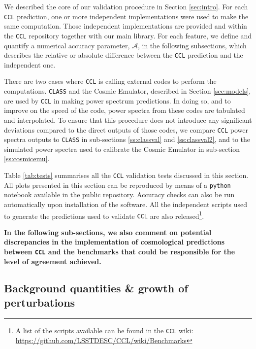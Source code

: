 \documentclass[\docopts]{\docclass}
\newcommand{\ccl}{{\tt CCL}\xspace}
\begin{document}
We described the core of our validation procedure in Section \ref{sec:intro}. For each \ccl prediction, one or more independent implementations were used to make the same computation. Those independent implementations are provided and within the \ccl repository together with our main library. For each feature, we define and quantify a numerical accuracy parameter, $\mathcal{A}$, in the following subsections, which describes the relative or absolute difference between the \ccl prediction and the independent one. 

There are two cases where \ccl is calling external codes to perform the computations. {\tt CLASS} and the Cosmic Emulator, described in Section \ref{sec:models}, are used by \ccl in making power spectrum predictions. In doing so, and to improve on the speed of the code, power spectra from these codes are tabulated and interpolated. To ensure that this procedure does not introduce any significant deviations compared to the direct outputs of those codes, we compare \ccl power spectra outputs to {\tt CLASS} in sub-sections \ref{ss:classval} and  \ref{ss:classval2}, and to the simulated power spectra used to calibrate the Cosmic Emulator in sub-section \ref{ss:cosmicemu}.



Table \ref{tab:tests} summarises all the \ccl validation tests discussed in this section. All plots presented in this section can be reproduced by means of a {\tt python} notebook available in the public repository. Accuracy checks can also be run automatically upon installation of the software. All the independent scripts used to generate the predictions used to validate \ccl are also released\footnote{A list of the scripts available can be found in the \ccl wiki: \url{https://github.com/LSSTDESC/CCL/wiki/Benchmarks}}.

{\bf In the following sub-sections, we also comment on potential discrepancies in the implementation of cosmological predictions between \ccl and the benchmarks that could be responsible for the level of agreement achieved.}

\subsection{Background quantities \& growth of perturbations}
\end{document}
